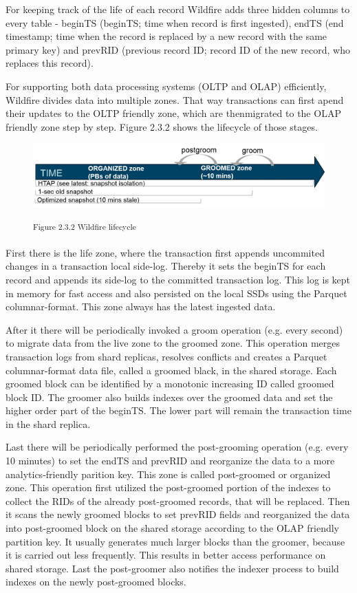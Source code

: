 For keeping track of the life of each record Wildfire adds three hidden columns to every table - \acs{beginTS} (\acl{beginTS}; time when record is first ingested), \acs{endTS} (end timestamp; time when the record is replaced by a new record with the same primary key) and \acs{prevRID} (previous record ID; record ID of the new record, who replaces this record). 

For supporting both data processing systems (OLTP and OLAP) efficiently, Wildfire divides data into multiple zones. That way transactions can first apend their updates to the OLTP friendly zone, which are thenmigrated to the OLAP friendly zone step by step. Figure 2.3.2 shows the lifecycle of those stages.

\begin{figure}[h]
\centering
\includegraphics[width=\textwidth]{images/wildfire_lifecycle.png}

\textsuperscript{Figure 2.3.2 Wildfire lifecycle}
\end{figure}

First there is the life zone, where the transaction first appends uncommited changes in a transaction local side-log. Thereby it sets the beginTS for each record and appends its side-log to the committed transaction log. This log is kept in memory for fast access and also persisted on the local SSDs using the Parquet columnar-format. This zone always has the latest ingested data.

After it there will be periodically invoked a groom operation (e.g. every second) to migrate data from the live zone to the groomed zone. This operation merges transaction logs from shard replicas, resolves conflicts and creates a Parquet columnar-format data file, called a groomed black, in the shared storage. Each groomed block can be identified by a monotonic increasing ID called groomed block ID. The groomer also builds indexes over the groomed data and set the higher order part of the beginTS. The lower part will remain the transaction time in the shard replica.

Last there will be periodically performed the post-grooming operation (e.g. every 10 minutes) to set the endTS and prevRID and reorganize the data to a more analytics-friendly parition key. This zone is called post-groomed or organized zone. This operation first utilized the post-groomed portion of the indexes to collect the RIDs of the already post-groomed records, that will be replaced. Then it scans the newly groomed blocks to set prevRID fields and reorganized the data into post-groomed block on the shared storage according to the OLAP friendly partition key. It usually generates much larger blocks than the groomer, because it is carried out less frequently. This results in better access performance on shared storage. Last the post-groomer also notifies the indexer process to build indexes on the newly post-groomed blocks.

